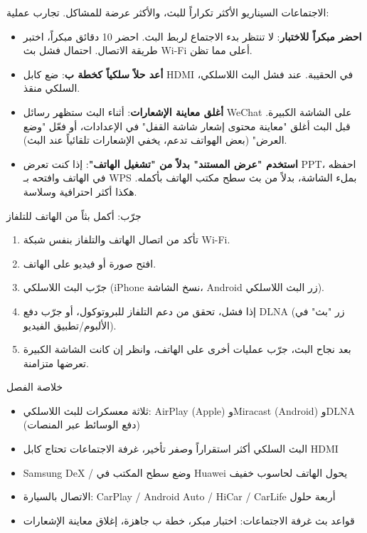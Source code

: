 
الاجتماعات السيناريو الأكثر تكراراً للبث، والأكثر عرضة للمشاكل. تجارب عملية:

\begin{itemize}
  \item \textbf{احضر مبكراً للاختبار}: لا تنتظر بدء الاجتماع لربط البث. احضر 10 دقائق مبكراً، اختبر طريقة الاتصال. احتمال فشل بث Wi-Fi أعلى مما تظن.
  \item \textbf{أعد حلاً سلكياً كخطة ب}: ضع كابل HDMI في الحقيبة. عند فشل البث اللاسلكي، السلكي منقذ.
  \item \textbf{أغلق معاينة الإشعارات}: أثناء البث ستظهر رسائل WeChat على الشاشة الكبيرة. قبل البث أغلق "معاينة محتوى إشعار شاشة القفل" في الإعدادات، أو فعّل "وضع العرض" (بعض الهواتف تدعم، يخفي الإشعارات تلقائياً عند البث).
  \item \textbf{استخدم "عرض المستند" بدلاً من "تشغيل الهاتف"}: إذا كنت تعرض PPT، احفظه في الهاتف وافتحه بـ WPS بملء الشاشة، بدلاً من بث سطح مكتب الهاتف بأكمله. هكذا أكثر احترافية وسلاسة.
\end{itemize}

\begin{tcbpractice}{جرّب: أكمل بثاً من الهاتف للتلفاز}
\begin{enumerate}
  \item تأكد من اتصال الهاتف والتلفاز بنفس شبكة Wi-Fi.
  \item افتح صورة أو فيديو على الهاتف.
  \item جرّب البث اللاسلكي (iPhone نسخ الشاشة، Android زر البث اللاسلكي).
  \item إذا فشل، تحقق من دعم التلفاز للبروتوكول، أو جرّب دفع DLNA (زر "بث" في الألبوم/تطبيق الفيديو).
  \item بعد نجاح البث، جرّب عمليات أخرى على الهاتف، وانظر إن كانت الشاشة الكبيرة تعرضها متزامنة.
\end{enumerate}

\end{tcbpractice}

\begin{tcbsummary}{خلاصة الفصل}
\begin{itemize}
  \item ثلاثة معسكرات للبث اللاسلكي: AirPlay (Apple) وMiracast (Android) وDLNA (دفع الوسائط عبر المنصات)
  \item البث السلكي أكثر استقراراً وصفر تأخير، غرفة الاجتماعات تحتاج كابل HDMI
  \item Samsung DeX / وضع سطح المكتب في Huawei يحول الهاتف لحاسوب خفيف
  \item الاتصال بالسيارة: CarPlay / Android Auto / HiCar / CarLife أربعة حلول
  \item قواعد بث غرفة الاجتماعات: اختبار مبكر، خطة ب جاهزة، إغلاق معاينة الإشعارات
\end{itemize}

\end{tcbsummary}
